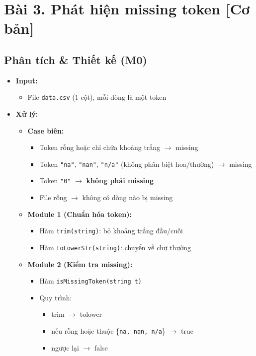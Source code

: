 \section{Bài 3. Phát hiện missing token [Cơ bản]}

\subsection{Phân tích \& Thiết kế (M0)}
\begin{itemize}
    \item \textbf{Input:}
    \begin{itemize}
        \item File \texttt{data.csv} (1 cột), mỗi dòng là một token
    \end{itemize}

    \item \textbf{Xử lý:}
    \begin{itemize}
        \item \textbf{Case biên:}
        \begin{itemize}
            \item Token rỗng hoặc chỉ chứa khoảng trắng $\rightarrow$ missing
            \item Token \texttt{"na"}, \texttt{"nan"}, \texttt{"n/a"} (không phân biệt hoa/thường) $\rightarrow$ missing
            \item Token \texttt{"0"} $\rightarrow$ \textbf{không phải missing}
            \item File rỗng $\rightarrow$ không có dòng nào bị missing
        \end{itemize}

        \item \textbf{Module 1 (Chuẩn hóa token):}
        \begin{itemize}
            \item Hàm \texttt{trim(string)}: bỏ khoảng trắng đầu/cuối
            \item Hàm \texttt{toLowerStr(string)}: chuyển về chữ thường
        \end{itemize}

        \item \textbf{Module 2 (Kiểm tra missing):}
        \begin{itemize}
            \item Hàm \texttt{isMissingToken(string t)}
            \item Quy trình:
            \begin{itemize}
                \item trim $\rightarrow$ tolower
                \item nếu rỗng hoặc thuộc \{\texttt{na, nan, n/a}\} $\rightarrow$ true
                \item ngược lại $\rightarrow$ false
            \end{itemize}
        \end{itemize}


\end{itemize}
\end{itemize}
